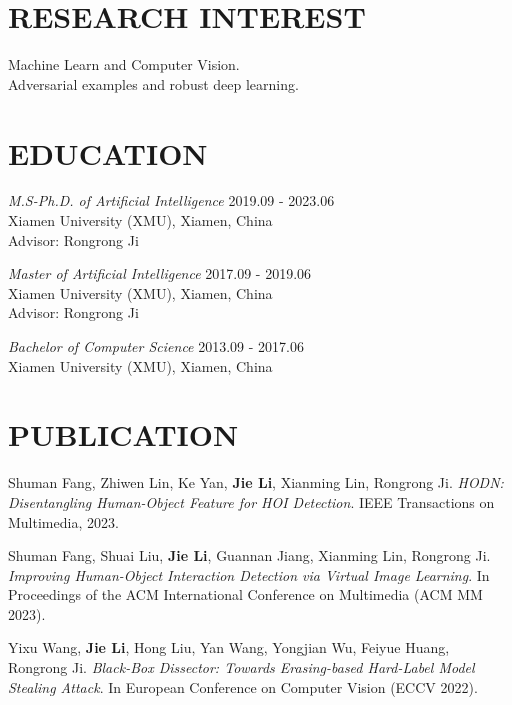 \documentclass[margin, 10pt]{res} %
\begin{document}
\begin{resume}


\section{RESEARCH INTEREST}
Machine Learn and Computer Vision. \\
Adversarial examples and robust deep learning.



\section{EDUCATION}

{\sl M.S-Ph.D. of Artificial Intelligence} \hfill 2019.09 - 2023.06 \\
Xiamen University (XMU), Xiamen, China \\
Advisor: Rongrong Ji

{\sl Master of Artificial Intelligence} \hfill 2017.09 - 2019.06 \\
Xiamen University (XMU), Xiamen, China \\
Advisor: Rongrong Ji

{\sl Bachelor of Computer Science} \hfill 2013.09 - 2017.06 \\
Xiamen University (XMU), Xiamen, China

\section{PUBLICATION}

Shuman Fang, Zhiwen Lin, Ke Yan, \textbf{Jie Li}, Xianming Lin, Rongrong Ji. \textit{HODN: Disentangling Human-Object Feature for HOI Detection}.
IEEE Transactions on Multimedia, 2023.

Shuman Fang, Shuai Liu, \textbf{Jie Li}, Guannan Jiang, Xianming Lin, Rongrong Ji. \textit{Improving Human-Object Interaction Detection via Virtual Image Learning}.
In Proceedings of the ACM International Conference on Multimedia (ACM MM 2023).

Yixu Wang, \textbf{Jie Li}, Hong Liu, Yan Wang, Yongjian Wu, Feiyue Huang, Rongrong Ji. \textit{Black-Box Dissector: Towards Erasing-based Hard-Label Model Stealing Attack}.
In European Conference on Computer Vision (ECCV 2022).


\end{resume}
\end{document}
